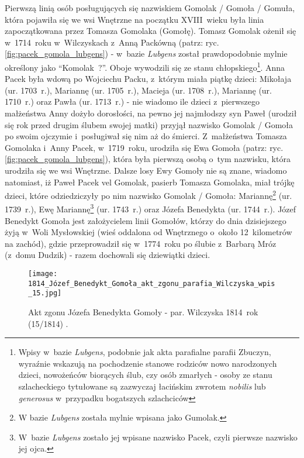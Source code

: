 Pierwszą linią osób posługujących się nazwiskiem Gomolak / Gomoła / Gomuła, 
która pojawiła się we wsi Wnętrzne na początku XVIII~wieku była linia 
zapoczątkowana przez Tomasza Gomolaka (Gomołę). Tomasz Gomolak ożenił się 
w~1714~roku w~Wilczyskach z~Anną Packówną (patrz: ryc. 
\ref{fig:pacek_gomola_lubgens}) - w~bazie \emph{Lubgens} został 
prawdopodobnie mylnie określony jako \enquote{Komolak~?}. Oboje wywodzili się 
ze stanu chłopskiego\footnote{Wpisy w~bazie \emph{Lubgens}, podobnie jak akta 
parafialne parafii Zbuczyn, wyraźnie wskazują na pochodzenie stanowe rodziców 
nowo narodzonych dzieci, nowożeńców biorących ślub, czy osób zmarłych - osoby 
ze stanu szlacheckiego tytułowane są zazwyczaj łacińskim zwrotem 
\emph{nobilis} lub \emph{generosus} w~przypadku bogatszych szlachciców}. Anna 
Pacek była wdową po Wojciechu Packu, z~którym miała piątkę dzieci: Mikołaja 
(ur. 1703~r.), Mariannę (ur. 1705~r.), Macieja (ur. 1708~r.), Mariannę 
(ur. 1710~r.) oraz Pawła (ur. 1713~r.) - nie wiadomo ile dzieci z~pierwszego 
małżeństwa Anny dożyło dorosłości, na pewno jej najmłodszy syn Paweł (urodził 
się rok przed drugim ślubem swojej matki) przyjął nazwisko Gomolak / Gomoła 
po swoim ojczymie i~posługiwał się nim aż do śmierci. Z~małżeństwa Tomasza 
Gomolaka i~Anny Pacek, w~1719~roku, urodziła się Ewa Gomoła (patrz: ryc. 
\ref{fig:pacek_gomola_lubgens}), która była pierwszą osobą o~tym nazwisku, 
która urodziła się we wsi Wnętrzne. Dalsze losy Ewy Gomoły nie są znane, 
wiadomo natomiast, iż Paweł Pacek vel Gomolak, pasierb Tomasza Gomolaka, miał 
trójkę dzieci, które odziedziczyły po nim nazwisko Gomolak / Gomoła: 
Mariannę\footnote{W bazie \emph{Lubgens} została mylnie wpisana jako 
Gumolak.} (ur. 1739~r.), Ewę Mariannę\footnote{W~bazie \emph{Lubgens} zostało 
jej wpisane nazwisko Pacek, czyli pierwsze nazwisko jej ojca.} (ur. 1743~r.) 
oraz Józefa Benedykta (ur. 1744~r.). Józef Benedykt Gomoła jest założycielem 
linii Gomołów, którzy do dnia dzisiejszego żyją w~Woli Mysłowskiej (wieś 
oddalona od Wnętrznego o~około 12~kilometrów na zachód), gdzie przeprowadził 
się w~1774~roku po ślubie z~Barbarą Mróz (z~domu Dudzik) - razem dochowali 
się dziewiątki dzieci.

\begin{figure}[!ht]
    \vspace*{0.5cm}
    \centering \texttt{[image: 
        1814\_Józef\_Benedykt\_Gomoła\_akt\_zgonu\_parafia\_Wilczyska\_wpis\_15.jpg]}
    \captionsetup{format=hang}
    \caption{Akt zgonu Józefa Benedykta Gomoły - par. Wilczyska 1814~rok 
    (15/1814) \cite{par_wilczyska1}.}
    \label{fig:jbgomola}
\end{figure}

